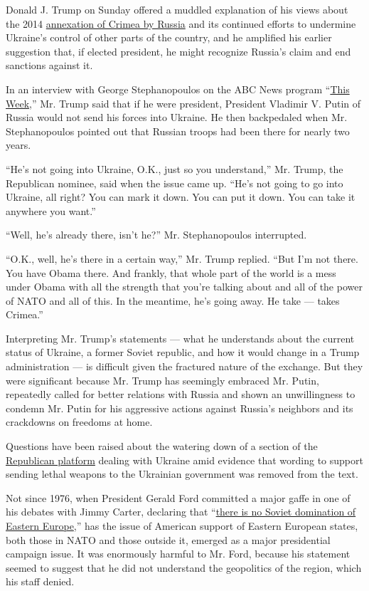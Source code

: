 Donald J. Trump on Sunday offered a muddled explanation of his views
about the 2014
\href{http://www.nytimes.com/2014/03/19/world/europe/ukraine.html}{annexation
of Crimea by Russia} and its continued efforts to undermine Ukraine's
control of other parts of the country, and he amplified his earlier
suggestion that, if elected president, he might recognize Russia's claim
and end sanctions against it.

In an interview with George Stephanopoulos on the ABC News program
``\href{http://abcnews.go.com/ThisWeek}{This Week},'' Mr. Trump said
that if he were president, President Vladimir V. Putin of Russia would
not send his forces into Ukraine. He then backpedaled when Mr.
Stephanopoulos pointed out that Russian troops had been there for nearly
two years.

``He's not going into Ukraine, O.K., just so you understand,'' Mr.
Trump, the Republican nominee, said when the issue came up. ``He's not
going to go into Ukraine, all right? You can mark it down. You can put
it down. You can take it anywhere you want.''

``Well, he's already there, isn't he?'' Mr. Stephanopoulos interrupted.

``O.K., well, he's there in a certain way,'' Mr. Trump replied. ``But
I'm not there. You have Obama there. And frankly, that whole part of the
world is a mess under Obama with all the strength that you're talking
about and all of the power of NATO and all of this. In the meantime,
he's going away. He take --- takes Crimea.''

Interpreting Mr. Trump's statements --- what he understands about the
current status of Ukraine, a former Soviet republic, and how it would
change in a Trump administration --- is difficult given the fractured
nature of the exchange. But they were significant because Mr. Trump has
seemingly embraced Mr. Putin, repeatedly called for better relations
with Russia and shown an unwillingness to condemn Mr. Putin for his
aggressive actions against Russia's neighbors and its crackdowns on
freedoms at home.

Questions have been raised about the watering down of a section of the
\href{https://www.gop.com/the-2016-republican-party-platform/}{Republican
platform} dealing with Ukraine amid evidence that wording to support
sending lethal weapons to the Ukrainian government was removed from the
text.

Not since 1976, when President Gerald Ford committed a major gaffe in
one of his debates with Jimmy Carter, declaring that
``\href{https://www.youtube.com/watch?v=PfyL4uQVJLw}{there is no Soviet
domination of Eastern Europe},'' has the issue of American support of
Eastern European states, both those in NATO and those outside it,
emerged as a major presidential campaign issue. It was enormously
harmful to Mr. Ford, because his statement seemed to suggest that he did
not understand the geopolitics of the region, which his staff denied.

